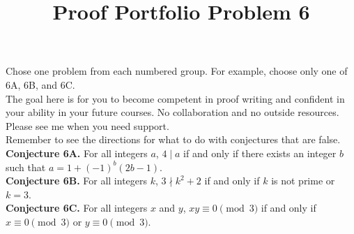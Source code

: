 \documentclass{article}  %
\title{Proof Portfolio Problem 6}
\author{}
\date{}
\begin{document}
\maketitle

Chose one problem from each numbered group.  For example, choose only one of 6A, 6B, and 6C.\\

The goal here is for you to become competent in proof writing and confident in your ability in your future courses.  No collaboration and no outside resources. Please see me when you need support.\\

Remember to see the directions for what to do with conjectures that are false.  \\




	
\noindent\textbf{Conjecture 6A.}   For all integers $a$, $4\mid a$ if and only if there exists an integer $b$ such that $a = 1 + (-1)^b(2b-1)$.\\  %

\noindent\textbf{Conjecture 6B.} For all integers $k$, $3 \nmid k^2+2$ if and only if $k$ is not prime or $k=3$.\\  %

\noindent\textbf{Conjecture 6C.} For all integers $x$ and $y$, $xy\equiv 0 \pmod{3}$ if and only if $x\equiv 0 \pmod{3}$ or $y\equiv 0\pmod{3}$.
\end{document}
